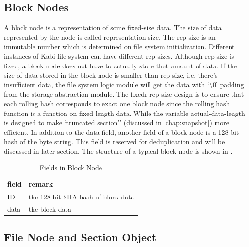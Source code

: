 \subsection{Block Nodes}

    A block node is a representation of some fixed-size data. The size of data represented by the node is called representation size. The rep-size is an immutable number which is determined on file system initialization. Different instances of Kabi file system can have different rep-sizes. Although rep-size is fixed, a block node does not have to actually store that amount of data. If the size of data stored in the block node is smaller than rep-size, i.e. there's insufficient data, the file system logic module will get the data with `\textbackslash0' padding from the storage abstraction module. The fixedr-rep-size design is to ensure that each rolling hash corresponds to exact one block node since the rolling hash function is a function on fixed length data. While the variable actual-data-length is designed to make `truncated section'' (discussed in \cref{chap:snapshot}) more efficient. In addition to the data field, another field of a block node is a 128-bit hash of the byte string. This field is reserved for deduplication and will be discussed in later section. The structure of a typical block node is shown in .

\begin{table}[t]
\begin{center}
\begin{tabular}{ll}
\toprule
field & remark\\
\midrule
ID & the 128-bit SHA hash of block data\\
data & the block data\\
\bottomrule
\end{tabular}
\end{center}
\caption{Fields in Block Node}
\label{tab:block_fields}
\end{table}

\subsection{File Node and Section Object}


